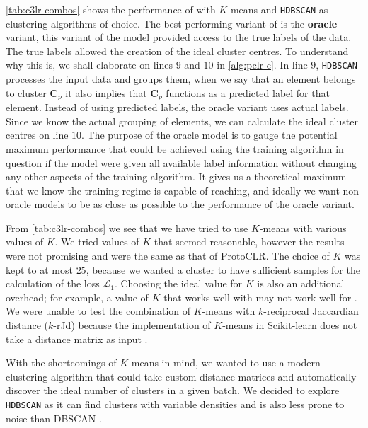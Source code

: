 \cref{tab:c3lr-combos} shows the performance of \ccclr{} with $K$-means and \texttt{HDBSCAN} as clustering algorithms of choice. The best performing variant of \ccclr{} is the \textbf{oracle} variant, this variant of the model provided access to the true labels of the data. The true labels allowed the creation of the ideal cluster centres. To understand why this is, we shall elaborate on lines $9$ and $10$ in \cref{alg:pclr-c}. In line $9$, \texttt{HDBSCAN} processes the input data and groups them, when we say that an element belongs to cluster $\symbf{C}_p$ it also implies that $\symbf{C}_p$ functions as a predicted label for that element. 
Instead of using predicted labels, the oracle variant uses actual labels. Since we know the actual grouping of elements, we can calculate the ideal cluster centres on line $10$. 
The purpose of the oracle model is to gauge the potential maximum performance that could be achieved using the training algorithm in question if the model were given all available label information without changing any other aspects of the training algorithm. 
It gives us a theoretical maximum that we know the training regime is capable of reaching, and ideally we want non-oracle models to be as close as possible to the performance of the oracle variant.

From \cref{tab:c3lr-combos} we see that we have tried to use $K$-means with various values of $K$. We tried values of $K$ that seemed reasonable, however the results were not promising and were the same as that of ProtoCLR. The choice of $K$ was kept to at most $25$, because we wanted a cluster to have sufficient samples for the calculation of the loss $\mathcal{L}_1$.
Choosing the ideal value for $K$ is also an additional overhead; for example, a value of $K$ that works well with \miniImagenet{} may not work well for \tieredImagenet{}.
We were unable to test the combination of $K$-means with $k$-reciprocal Jaccardian distance ($k$-rJd) because the implementation of $K$-means in Scikit-learn does not take a distance matrix as input \parencite{scikit-learn}.

With the shortcomings of $K$-means in mind, we wanted to use a modern clustering algorithm that could take custom distance matrices and automatically discover the ideal number of clusters in a given batch. We decided to explore \texttt{HDBSCAN} as it can find clusters with variable densities and is also less prone to noise than DBSCAN \parencite{McInnes2017Hdbscan:Clustering}. 

